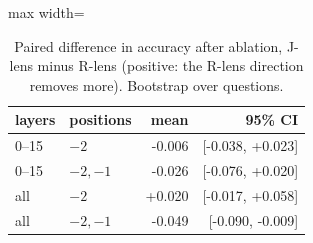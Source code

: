 \begin{table}[t]
\centering
\footnotesize
\caption{Paired difference in accuracy after ablation, J-lens minus R-lens (positive: the R-lens direction removes more). Bootstrap over questions.}
\label{tab:rlens_paired}
\begin{adjustbox}{max width=\textwidth}
\begin{tabular}{llrr}
\toprule
layers & positions & mean & 95\% CI \\
\midrule
0--15 & $-2$ & -0.006 & [-0.038, +0.023] \\
0--15 & $-2,-1$ & -0.026 & [-0.076, +0.020] \\
all & $-2$ & +0.020 & [-0.017, +0.058] \\
all & $-2,-1$ & -0.049 & [-0.090, -0.009] \\
\bottomrule
\end{tabular}
\end{adjustbox}
\end{table}